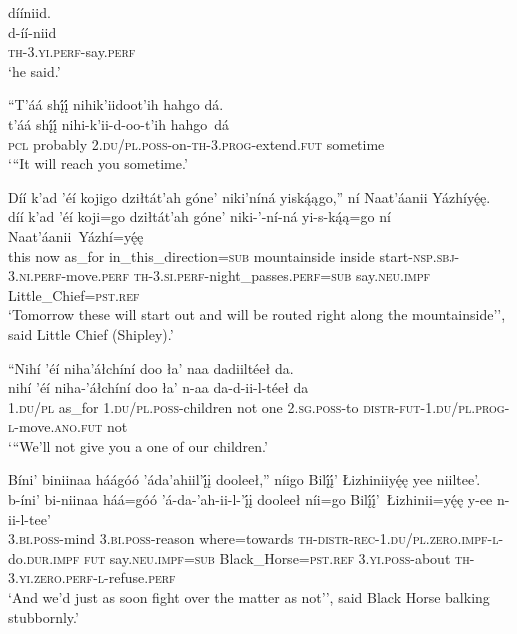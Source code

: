 \newpage
\ea\label{ex:text1-32-2}
dííniid.\\
\gll d-íí-niid\\
     \textsc{th}-3.\textsc{yi}.\textsc{perf}-say.\textsc{perf}\\
\glt `he said.'
\z

\ea\label{ex:text1-33-1}
``T’áá shį́į́ nihik’iidoot’ih hahgo dá.\\
\gll t’áá	shį́į́	nihi-k’ii-d-oo-t’ih	hahgo~{dá}\\
     \textsc{pcl}	probably	2.\textsc{du}/\textsc{pl}.\textsc{poss}-on-\textsc{th}-3.\textsc{prog}-extend.\textsc{fut}	sometime\\
\glt `{``}It will reach you sometime.'
\z

\ea\label{ex:text1-33-2}
Díí k’ad ’éí kojigo dziłtát’ah góne’ niki’níná yiską́ągo,'' ní Naat’áanii Yázhíyę́ę.\\
\gll díí	k’ad	’éí	koji=go	dziłtát’ah	góne’	niki-’-ní-ná	yi-s-ką́ą=go	ní	Naat’áanii~{Yázhí=yę́ę}\\
     this	now	as\_for	in\_this\_direction=\textsc{sub}	mountainside	inside	start-\textsc{nsp}.\textsc{sbj}-3.\textsc{ni}.\textsc{perf}-move.\textsc{perf}	\textsc{th}-3.\textsc{si}.\textsc{perf}-night\_passes.\textsc{perf}=\textsc{sub}	say.\textsc{neu}.\textsc{impf}	Little\_Chief=\textsc{pst}.\textsc{ref}\\
\glt `Tomorrow these will start out and will be routed right along the mountainside'', said Little Chief (Shipley).'
\z

\ea\label{ex:text1-34-1}
``Nihí ’éí niha’áłchíní doo ła’ naa dadiiltéeł da.\\
\gll nihí	’éí	niha-’áłchíní	doo	ła’	n-aa	da-d-ii-l-téeł	da\\
     1.\textsc{du}/\textsc{pl}	as\_for	1.\textsc{du}/\textsc{pl}.\textsc{poss}-children	not	one	2.\textsc{sg}.\textsc{poss}-to	\textsc{distr}-\textsc{fut}-1.\textsc{du}/\textsc{pl}.\textsc{prog}-\textsc{l}-move.\textsc{ano}.\textsc{fut}	not\\
\glt `{``}We'll not give you a one of our children.'
\z

\ea\label{ex:text1-34-2}
Bíni’ biniinaa háágóó ’áda’ahiil’į́į dooleeł,'' níigo Bilį́į́’ Łizhiniiyę́ę yee niiltee’.\\
\gll b-íni’	bi-niinaa	háá=góó	’á-da-’ah-ii-l-’į́į	dooleeł	níi=go	Bilį́į́’~{Łizhinii=yę́ę}	y-ee	n-ii-l-tee’\\
     3.\textsc{bi}.\textsc{poss}-mind	3.\textsc{bi}.\textsc{poss}-reason	where=towards	\textsc{th}-\textsc{distr}-\textsc{rec}-1.\textsc{du}/\textsc{pl}.\textsc{zero}.\textsc{impf}-\textsc{l}-do.\textsc{dur}.\textsc{impf}	\textsc{fut}	say.\textsc{neu}.\textsc{impf}=\textsc{sub}	Black\_Horse=\textsc{pst}.\textsc{ref}	3.\textsc{yi}.\textsc{poss}-about	\textsc{th}-3.\textsc{yi}.\textsc{zero}.\textsc{perf}-\textsc{l}-refuse.\textsc{perf}\\
\glt `And we'd just as soon fight over the matter as not'', said Black Horse balking stubbornly.'
\z


